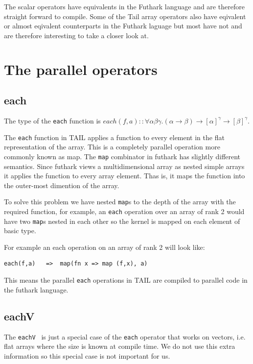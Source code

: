 \documentclass[11pt]{article}
\begin{document}
The scalar operators have equivalents in the Futhark language and are therefore straight forward to compile. Some of the Tail array operators also have eqivalent or almost eqivalent counterparts in the Futhark laguage but most have not and are therefore interesting to take a closer look at.

\section{The parallel operators}

\subsection{each}

The type of the {\tt each} function is $each(f,a) :: \forall\alpha\beta\gamma.(\alpha \to \beta) \to [\alpha]^\gamma \to [\beta]^\gamma$.

The {\tt each} function in TAIL applies a function to every element in the flat representation of the array. This is a completely parallel operation more commonly known as map. The {\tt map} combinator in futhark has slightly different semantics.
Since futhark views a multidimensional array as nested simple arrays it applies the function to every array element.
Thas is, it maps the function into the outer-most dimention of the array.

To solve this problem we have nested {\tt map}s to the depth of the array with the required function, for example, an {\tt each} operation over an array of rank 2 would have two {\tt map}s nested in each other so the kernel is mapped on each element of basic type.

For example an each operation on an array of rank 2 will look like:
\begin{lstlisting}[numbers=none,frame=none]
each(f,a)	=>	map(fn x => map (f,x), a)
\end{lstlisting}

This means the parallel {\tt each} operations in TAIL are compiled to parallel code in the futhark language.

\subsection{eachV}
The {\tt eachV } is just a special case of the {\tt each} operator that works on vectors, i.e. flat arrays where the size
is known at compile time. We do not use this extra information so this special case is not important for us.
\end{document}
